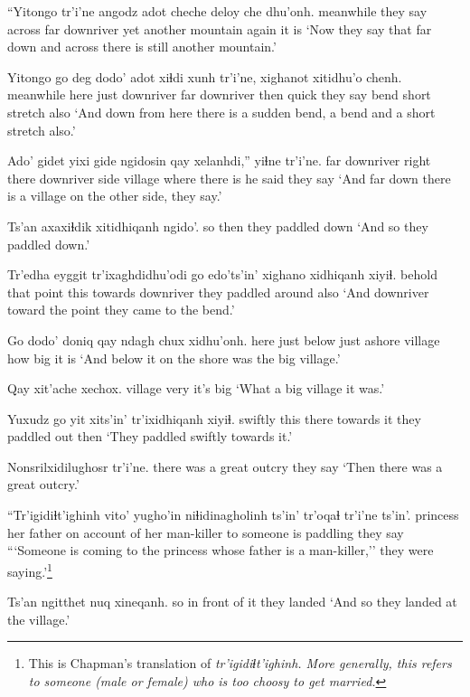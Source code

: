 \documentclass[12pt]{article}
\begin{document}
\gll ``Yitongo tr'i'ne angodz adot   cheche deloy  che dhu'onh.
meanwhile {they say} across {far downriver}  {yet another} mountain again {it is}
\glt `Now they say that far down and across there is still another mountain.'
\glend

\gll Yitongo {go deg} dodo' adot  xiɬdi xunh tr'i'ne, xighanot xitidhu'o  chenh.
meanwhile  here {just downriver} {far downriver} then quick {they say} bend  {short stretch} also
\glt `And down from here there is a sudden bend, a bend and a short stretch also.'
\glend

\gll Ado'       {gidet yixi} {gide ngidosin}          qay     xelanhdi,''  yiɬne  tr'i'ne.
{far downriver} {right there} {downriver side} village {where there is} {he said} {they say}
\glt `And far down there is a village on the other side, they say.'
\glend

\gll Ts'an axaxiɬdik xitidhiqanh ngido'.
so then {they paddled} down
\glt `And so they paddled down.'
\glend

\gll Tr'edha eyggit  tr'ixaghdidhu'odi  go edo'ts'in' {xighano xidhiqanh} xiyiɬ.
behold  that  point   this {towards downriver} {they paddled around}  also
\glt `And downriver toward the point they came to the bend.'
\glend

\gll Go dodo' doniq qay ndagh chux xidhu'onh.
here {just below} {just ashore} village how big {it is}
\glt `And below it on the shore was the big village.'
\glend

\gll Qay xit'ache xechox.
village very {it's big}
\glt `What a big village it was.'
\glend

\gll Yuxudz go yit xits'in' tr'ixidhiqanh xiyiɬ.
swiftly  this there {towards it} {they paddled out} then
\glt `They paddled swiftly towards it.'
\glend

\gll Nonsrilxidilughosr  tr'i'ne.
{there was a great outcry}  {they say}
\glt `Then there was a great outcry.'
\glend

\gll ``Tr'igidiɬt'ighinh vito'  yugho'in  niɬidinagholinh ts'in' tr'oqaɬ  tr'i'ne ts'in'.
princess  {her father} {on account of her} man-killer {} to {someone is paddling} {they say} 
\glt ```Someone is coming to the princess whose father is a man-killer,'' they were saying.'\footnote{This is Chapman's translation of \em tr'igidiɬt'ighinh. \em More generally, this refers to someone (male or female) who is too choosy to get married.}
\glend

\gll Ts'an ngitthet {nuq xineqanh.}
so {in front of it} {they landed}
\glt `And so they landed at the village.'
\glend
\end{document}
